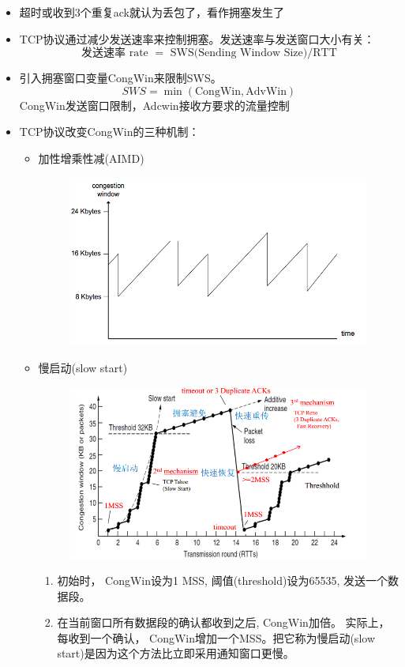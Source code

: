 \begin{itemize}
    \item 超时或收到3个重复ack就认为丢包了，看作拥塞发生了
    \item TCP协议通过减少发送速率来控制拥塞。发送速率与发送窗口大小有关：
\[\text{发送速率 rate $=$ SWS(Sending Window Size)$/$RTT}\]
    \item 引入拥塞窗口变量CongWin来限制SWS。
\[SWS = \min(\text{CongWin}, \text{AdvWin})\]
CongWin发送窗口限制，Adcwin接收方要求的流量控制
    \item TCP协议改变CongWin的三种机制：
    \begin{itemize}
        \item 加性增乘性减(AIMD)
        \begin{figure}[H]
            \centering
            \includegraphics[width=0.6\linewidth]{fig/congression-AIMD.PNG}
        \end{figure}
        \item 慢启动(slow start)
        \begin{figure}[H]
            \centering
            \includegraphics[width=0.6\linewidth]{fig/congression-slow-start.PNG}
        \end{figure}
        \begin{enumerate}
            \item 初始时， CongWin设为1 MSS, 阈值(threshold)设为65535, 发送一个数据段。
            \item 在当前窗口所有数据段的确认都收到之后, CongWin加倍。
            实际上，每收到一个确认， CongWin增加一个MSS。把它称为慢启动(slow start)是因为这个方法比立即采用通知窗口更慢。

\end{enumerate}
\end{itemize}
\end{itemize}

